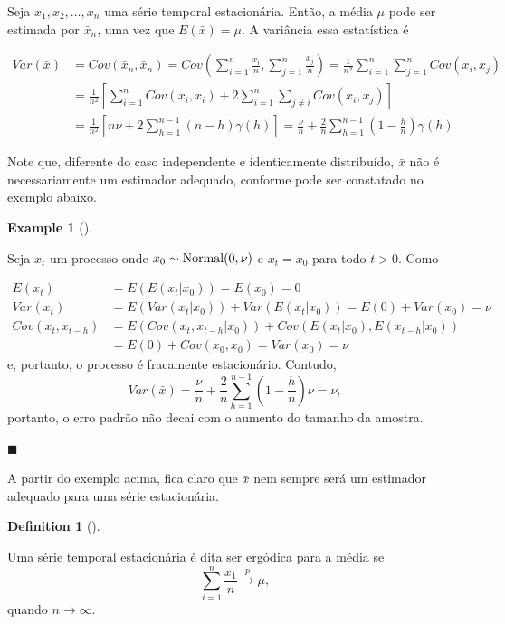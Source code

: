 \documentclass[
  letterpaper,
  DIV=11,
  numbers=noendperiod]{scrreprt}
\theoremstyle{plain}
\theoremstyle{definition}
\newtheorem{definition}{Definition}[chapter]
\theoremstyle{definition}
\newtheorem{example}{Example}[chapter]
\theoremstyle{remark}
\begin{document}
Seja \(x_1,x_2,\ldots,x_n\) uma série temporal estacionária. Então, a
média \(\mu\) pode ser estimada por \(\bar{x}_n\), uma vez que
\(E(\bar{x})=\mu\). A variância essa estatística é

\[\begin{align}Var(\bar{x})&=Cov(\bar{x}_n,\bar{x}_n)=Cov\left(\sum_{i=1}^n \frac{x_i}{n},\sum_{j=1}^n\frac{x_j}{n}\right)=\frac{1}{n^2}\sum_{i=1}^n\sum_{j=1}^nCov(x_i,x_j)\\
&=\frac{1}{n^2}\left[\sum_{i=1}^nCov(x_i,x_i)+2\sum_{i=1}^n\sum_{j\neq i}Cov(x_i,x_j)\right]\\
&=\frac{1}{n^2}\left[n\nu+2\sum_{h=1}^{n-1}(n-h)\gamma(h)\right]=\frac{\nu}{n}+\frac{2}{n}\sum_{h=1}^{n-1}\left(1-\frac{h}{n}\right)\gamma(h)
\end{align}\]

Note que, diferente do caso independente e identicamente distribuído,
\(\bar{x}\) não é necessariamente um estimador adequado, conforme pode
ser constatado no exemplo abaixo.

\begin{example}[]\protect\hypertarget{exm-estationario_nao_ergodico}{}\label{exm-estationario_nao_ergodico}

Seja \(x_t\) um processo onde \(x_0\sim\hbox{Normal}(0,\nu)\) e
\(x_t=x_0\) para todo \(t>0\). Como

\[\begin{align}
E(x_t)&=E(E(x_t|x_0))=E(x_0)=0\\
Var(x_t)&=E(Var(x_t|x_0))+Var(E(x_t|x_0))=E(0)+Var(x_0)=\nu\\
Cov(x_t,x_{t-h})&=E( Cov(x_t,x_{t-h}|x_0))+Cov( E(x_t|x_0),E(x_{t-h}|x_0))\\
&=E(0)+Cov(x_0,x_0)=Var(x_0)=\nu
\end{align}\] e, portanto, o processo é fracamente estacionário.
Contudo,
\[Var(\bar{x})=\frac{\nu}{n}+\frac{2}{n}\sum_{h=1}^{n-1}\left(1-\frac{h}{n}\right)\nu=\nu,\]
portanto, o erro padrão não decai com o aumento do tamanho da amostra.

\(\blacksquare\)

\end{example}

A partir do exemplo acima, fica claro que \(\bar{x}\) nem sempre será um
estimador adequado para uma série estacionária.

\begin{definition}[]\protect\hypertarget{def-ergodica}{}\label{def-ergodica}

Uma série temporal estacionária é dita ser ergódica para a média se
\[\sum_{i=1}^n\frac{x_1}{n}\stackrel{p}{\rightarrow} \mu,\] quando
\(n\rightarrow\infty\).

\end{definition}
\end{document}

